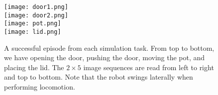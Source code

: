 \begin{figure}
	\centering
	\texttt{[image: door1.png]}\\
	\vspace{1em}             
	\texttt{[image: door2.png]}\\
	\vspace{1em}             
	\texttt{[image: pot.png]}\\
	\vspace{1em}             
	\texttt{[image: lid.png]}
	\caption{A successful episode from each simulation task. From top to bottom, we have opening the door, pushing the door, moving the pot, and placing the lid. The $2 \times 5$ image sequences are read from left to right and top to bottom. Note that the robot swings laterally when performing locomotion. }
	\label{figure:sim-eval}
\end{figure}
